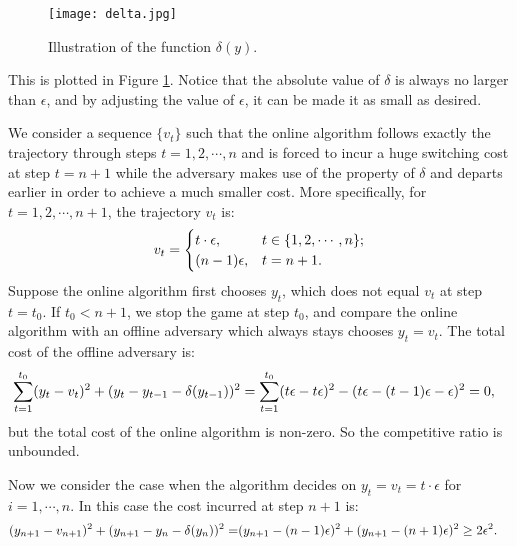 \begin{figure}[t]
\vskip 0.2in
\begin{center}
\centerline{\texttt{[image: delta.jpg]}}
\caption{Illustration of the function $\delta(y)$.}
\label{f.delta}
\end{center}
\vskip -0.2in
\end{figure}

This is plotted in Figure \ref{f.delta}. Notice that the absolute value of $\delta$ is always no larger than $\epsilon$, and by adjusting the value of $\epsilon$, it can be made it as small as desired.

We consider a sequence $\{v_t\}$ such that the online algorithm follows exactly the trajectory through steps $t=1,2,\cdots,n$ and is forced to incur a huge switching cost at step $t=n+1$ while the adversary makes use of the property of $\delta$ and departs earlier in order to achieve a much smaller cost. More specifically, for $t=1,2,\cdots,n+1$, the trajectory $v_t$ is:
\begin{align}
    v_t=\begin{cases}
    t\cdot\epsilon, & t\in\{1,2,\cdots,n\};\\
    (n-1)\epsilon, & t=n+1.
    \end{cases}\notag
\end{align}
Suppose the online algorithm first chooses $y_t$, which does not equal $v_t$ at step $t=t_0$. If $t_0<n+1$, we stop the game at step $t_0$, and compare the online algorithm with an offline adversary which always stays chooses $y_t=v_t$. The total cost of the offline adversary is:
\begin{align}
    &\sum_{t=1}^{t_0}(y_t-v_t)^2+(y_t-y_{t-1}-\delta(y_{t-1}))^2    =\sum_{t=1}^{t_0}(t\epsilon-t\epsilon)^2-(t\epsilon-(t-1)\epsilon-\epsilon)^2
    =0,\notag
\end{align}
but the total cost of the online algorithm is non-zero. So the competitive ratio is unbounded.  

Now we consider the case when the algorithm decides on $y_t=v_t=t\cdot\epsilon$ for $i=1,\cdots,n$. In this case the cost incurred at step $n+1$ is:
\begin{align}
   (y_{n+1}-v_{n+1})^2+(y_{n+1}-y_n-\delta(y_n))^2
   =&(y_{n+1}-(n-1)\epsilon)^2+(y_{n+1}-(n+1)\epsilon)^2
   \ge2\epsilon^2.\notag
\end{align}

